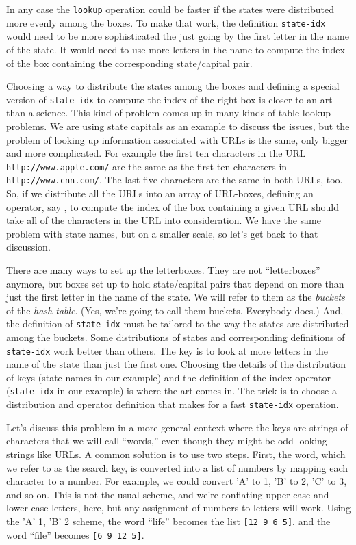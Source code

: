 In any case the \texttt{lookup} operation could be faster
if the states were distributed more evenly among the boxes.
To make that work, the definition
\texttt{state-idx} would need to be more sophisticated
the just going by the first letter in the name of the state.
It would need to use more letters in the name 
to compute the index of the box containing the corresponding
state/capital pair.

Choosing a way to distribute the states among the boxes
and defining a special version of \texttt{state-idx} 
to compute the index of the right box is closer to an
art than a science. This kind of problem comes up in
many kinds of table-lookup problems. We are using
state capitals as an example to discuss the issues,
but the problem of looking up information associated
with URLs is the same, only bigger and more complicated.
For example the first ten characters in the URL
\texttt{http://www.apple.com/} are the same as the first ten
characters in \texttt{http://www.cnn.com/}. The last five
characters are the same in both URLs, too.
So, if we distribute all the URLs into an array of URL-boxes,
defining an operator, say , to compute the
index of the box containing a given URL should take
all of the characters in the URL into consideration.
We have the same problem with state names, but on a
smaller scale, so let's get back to that discussion.

There are many ways to set up the letterboxes.
They are not ``letterboxes'' anymore, but boxes set up to hold
state/capital pairs that depend
on more than just the first letter in the name of the state.
We will refer to them as the
\emph{buckets}
of the \emph{hash table}.
(Yes, we're going to call them buckets. Everybody does.)
And, the definition of \texttt{state-idx} must be
tailored to the way the states are distributed among the buckets.
Some distributions of states and corresponding definitions
of \texttt{state-idx} work better than others.
The key is to look at more letters in the name of the state
than just the first one.
Choosing the details of the distribution of keys
(state names in our example) and the definition of the index operator
(\texttt{state-idx} in our example) is where the art comes in.
The trick is to choose a distribution and operator
definition that makes for a fast \texttt{state-idx} operation.

Let's discuss this problem in a more general context
where the keys are strings of characters that we will
call ``words,'' even though they might be odd-looking 
strings like URLs.
A common solution is to use two steps. First, the word, 
which we refer to as the search key, is converted
into a list of numbers by mapping each character to a number. For
example, we could convert 'A' to 1, 'B' to 2, 'C' to 3, and so on.
This is not the usual scheme, and we're conflating upper-case and
lower-case letters, here, but any assignment of numbers to letters
will work.
Using the 'A' 1, 'B' 2 scheme, the word ``life'' becomes the list 
\texttt{[12 9 6 5]},
and the word ``file'' becomes \texttt{[6 9 12 5]}.

